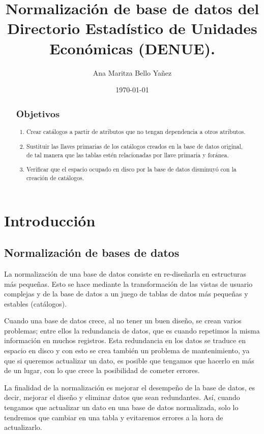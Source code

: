 \documentclass{article}
\title{Normalización de base de datos del Directorio Estadístico de Unidades Económicas (DENUE).}
\author{
    Ana Maritza Bello Yañez
}
\date{\today}
\begin{document}
\maketitle


\begin{abstract}
    \subsection*{Objetivos}
    \begin{enumerate}
        \item Crear catálogos a partir de atributos que no tengan dependencia a
        otros atributos.
        \item Sustituir las llaves primarias de los catálogos creados en la base
        de datos original, de tal manera que las tablas estén relacionadas por
        llave primaria y foránea.
        \item Verificar que el espacio ocupado en disco por la base de datos
        disminuyó con la creación de catálogos.
    \end{enumerate}
\end{abstract}

\section{Introducción}

\subsection*{Normalización de bases de datos}

La normalización de una base de datos consiste en re-diseñarla en estructuras
más pequeñas. Esto se hace mediante la transformación de las vistas de usuario
complejas y de la base de datos a un juego de tablas de datos más pequeñas y
estables (catálogos).

Cuando una base de datos crece, al no tener un buen diseño, se crean varios
problemas; entre ellos la redundancia de datos, que es cuando repetimos la misma
información en muchos registros. Esta redundancia en los datos se traduce en
espacio en disco y con esto se crea también un problema de mantenimiento, ya que
si queremos actualizar un dato, es posible que tengamos que hacerlo en más de un
lugar, con lo que crece la posibilidad de cometer errores.

La finalidad de la normalización es mejorar el desempeño de la base de datos, es
decir, mejorar el diseño y eliminar datos que sean redundantes. Así, cuando
tengamos que actualizar un dato en una base de datos normalizada, solo lo
tendremos que cambiar en una tabla y evitaremos errores a la hora de
actualizarlo.
\end{document}
